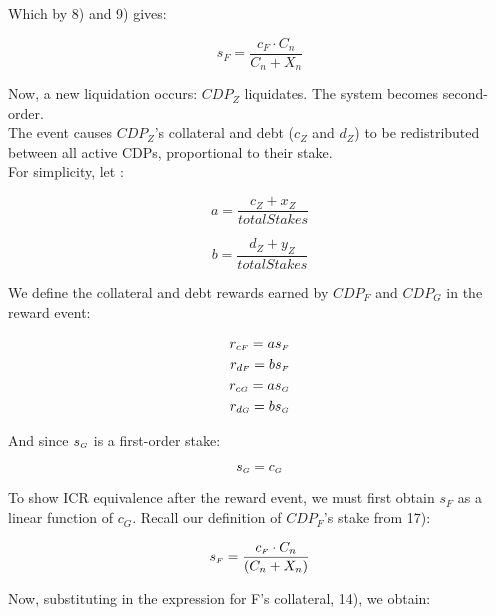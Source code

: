 \documentclass[reqno]{article}
\begin{document}
\bigskip
Which by 8) and 9) gives:

\begin{equation} 
    s_F=\frac{c_F \cdot C_n}{C_n+X_n}
\end{equation}

\bigskip
Now, a new liquidation occurs: $CDP_Z$ liquidates. The system becomes second-order.\\

The event causes $CDP_Z$’s collateral and debt ($c_Z$ and $d_Z$) to be redistributed between all active CDPs, proportional to their stake.\\

For simplicity, let :

\begin{equation} 
    a=\frac{c_Z+x_Z}{totalStakes}
\end{equation}

\begin{equation} 
    b=\frac{d_Z+y_Z}{totalStakes}
\end{equation}

\bigskip
We define the collateral and debt rewards earned by $CDP_F$ and $CDP_G$ in the reward event:

\begin{equation}
    \begin{split}
        r_{c\mathsmaller{F}}=as_\mathsmaller{F}\\
        r_{d\mathsmaller{F}}=bs_\mathsmaller{F}\\
        r_{c\mathsmaller{G}}=as_\mathsmaller{G}\\
        r_{d\mathsmaller{G}}=bs_\mathsmaller{G}
    \end{split}
\end{equation}

\bigskip
And since $s_\mathsmaller{G}$ is a first-order stake:

\begin{equation} 
    s_\mathsmaller{G}=c_\mathsmaller{G}
\end{equation}

\bigskip
To show ICR equivalence after the reward event, we must first obtain $s_F$ as a linear function of $c_G$. Recall our definition of $CDP_F$’s stake from 17):

\begin{equation} 
    s_\mathsmaller{F}=\frac{c_\mathsmaller{F} \cdot C_n}{(C_n+X_n)}
\end{equation}

\bigskip
Now, substituting in the expression for F’s collateral, 14), we obtain:
\end{document}
